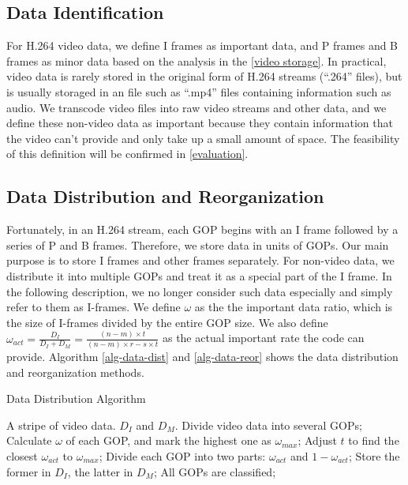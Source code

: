 \documentclass[sigconf]{acmart}
\begin{document}
\subsection{Data Identification}
For H.264 video data, we define I frames as important data, and P frames and B frames as minor data based on the analysis in the \ref{video storage}. In practical, video data is rarely stored in the original form of H.264 streams (``.264'' files), but is usually storaged in an file such as ``.mp4'' files containing information such as audio. We transcode video files into raw video streams and other data, and we define these non-video data as important because they contain information that the video can't provide and only take up a small amount of space. The feasibility of this definition will be confirmed in \ref{evaluation}.

\subsection{Data Distribution and Reorganization}
Fortunately, in an H.264 stream, each GOP begins with an I frame followed by a series of P and B frames. Therefore, we store data in units of GOPs. Our main purpose is to store I frames and other frames separately. For non-video data, we distribute it into multiple GOPs and treat it as a special part of the I frame. In the following description, we no longer consider such data especially and simply refer to them as I-frames.
We define $\omega$ as the the important data ratio, which is the size of I-frames divided by the entire GOP size. We also define $\omega_{act}=\frac{D_I}{D_I+D_M}=\frac{(n-m) \times t}{(n-m) \times r-s \times t}$ as the actual important rate the code can provide. Algorithm \ref{alg-data-dist} and \ref{alg-data-reor} shows the data distribution and reorganization methods.

\begin{algorithm}[htb] 
\caption{Data Distribution Algorithm} 
\label{alg-data-dist} 
\begin{algorithmic}[1] 
\Require A stripe of video data.
\Ensure $D_I$ and $D_M$.
\State Divide video data into several GOPs;
\State Calculate $\omega$ of each GOP, and mark the highest one as $\omega_{max}$;
\State Adjust $t$ to find the closest $\omega_{act}$ to $\omega_{max}$;
\Repeat 
\State Divide each GOP into two parts: $\omega_{act}$ and $1-\omega_{act}$;
\State Store the former in $D_I$, the latter in $D_M$;
\Until All GOPs are classified;
\end{algorithmic} 
\end{algorithm}
\end{document}
